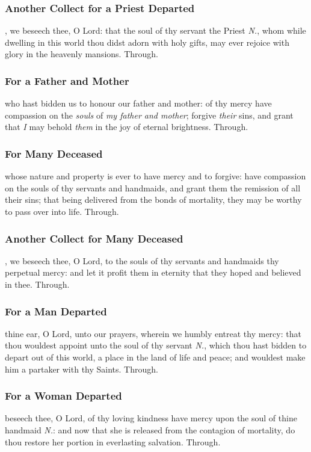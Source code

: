 \subsubsection{Another Collect for a Priest Departed}
, we beseech thee, O Lord: that the soul of thy servant the Priest \textit{N.}, whom while dwelling in this world thou didst adorn with holy gifts, may ever rejoice with glory in the heavenly mansions. Through.

\subsubsection{For a Father and Mother}
 who hast bidden us to honour our father and mother: of thy mercy have compassion on the \textit{souls} of \textit{my father and mother}; forgive \textit{their} sins, and grant that \textit{I} may behold \textit{them} in the joy of eternal brightness. Through.

\subsubsection{For Many Deceased}
 whose nature and property is ever to have mercy and to forgive: have compassion on the souls of thy servants and handmaids, and grant them the remission of all their sins; that being delivered from the bonds of mortality, they may be worthy to pass over into life. Through.

\subsubsection{Another Collect for Many Deceased}
, we beseech thee, O Lord, to the souls of thy servants and handmaids thy perpetual mercy: and let it profit them in eternity that they hoped and believed in thee. Through.

\subsubsection{For a Man Departed}
 thine ear, O Lord, unto our prayers, wherein we humbly entreat thy mercy: that thou wouldest appoint unto the soul of thy servant \textit{N.}, which thou hast bidden to depart out of this world, a place in the land of life and peace; and wouldest make him a partaker with thy Saints. Through.

\subsubsection{For a Woman Departed}
 beseech thee, O Lord, of thy loving kindness have mercy upon the soul of thine handmaid \textit{N.}: and now that she is released from the contagion of mortality, do thou restore her portion in everlasting salvation. Through.

